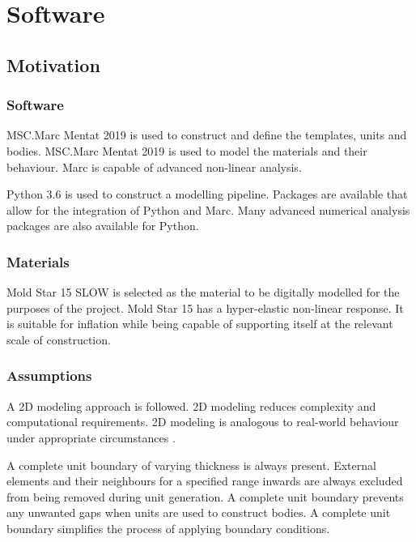 \chapter{Software}
\label{chp:S}

\section{Motivation}

\subsection{Software}

MSC.Marc Mentat 2019 is used to construct and define the templates, units and bodies. MSC.Marc Mentat 2019 is used to model the materials and their behaviour. Marc is capable of advanced non-linear analysis.

Python 3.6 is used to construct a modelling pipeline. Packages are available that allow for the integration of Python and Marc. Many advanced numerical analysis packages are also available for Python.

\subsection{Materials}

Mold Star 15 SLOW is selected as the material to be digitally modelled for the purposes of the project. Mold Star 15 has a hyper-elastic non-linear response. It is suitable for inflation while being capable of supporting itself at the relevant scale of construction.

\subsection{Assumptions}

A 2D modeling approach is followed. 2D modeling reduces complexity and computational requirements. 2D modeling is analogous to real-world behaviour under appropriate circumstances \cite{Ellis2020, Joubert2020}.

A complete unit boundary of varying thickness is always present. External elements and their neighbours for a specified range inwards are always excluded from being removed during unit generation. A complete unit boundary prevents any unwanted gaps when units are used to construct bodies. A complete unit boundary simplifies the process of applying boundary conditions.

